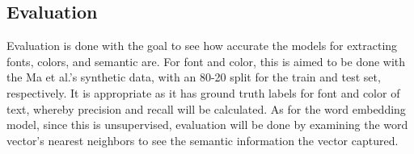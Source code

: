 \subsection{Evaluation}
Evaluation is done with the goal to see how accurate the models for extracting fonts, colors, and semantic are. For font and color, this is aimed to be done with the Ma et al.'s synthetic data, with an 80-20 split for the train and test set, respectively. It is appropriate as it has ground truth labels for font and color of text, whereby precision and recall will be calculated. As for the word embedding model, since this is unsupervised, evaluation will be done by examining the word vector's nearest neighbors to see the semantic information the vector captured.